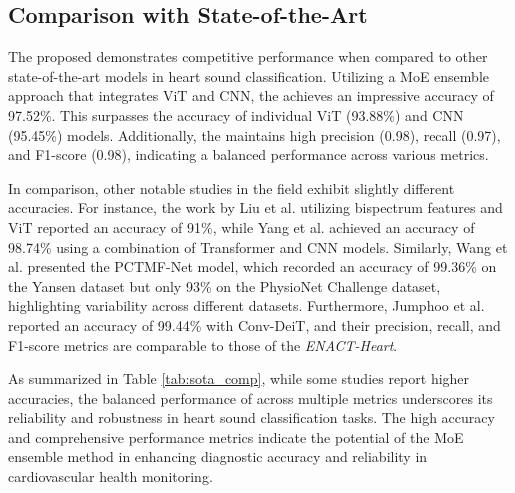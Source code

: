 



\subsection{Comparison with State-of-the-Art}
The proposed \ENACT demonstrates competitive performance when compared to other state-of-the-art models in heart sound classification. Utilizing a MoE ensemble approach that integrates ViT and CNN, the \ENACT achieves an impressive accuracy of 97.52\%. This surpasses the accuracy of individual ViT (93.88\%) and CNN (95.45\%) models. Additionally, the \ENACT maintains high precision (0.98), recall (0.97), and F1-score (0.98), indicating a balanced performance across various metrics.


In comparison, other notable studies in the field exhibit slightly different accuracies. For instance, the work by Liu et al. \cite{liu_heart_2023} utilizing bispectrum features and ViT reported an accuracy of 91\%, while Yang et al. \cite{yang_assisting_2023} achieved an accuracy of 98.74\% using a combination of Transformer and CNN models. Similarly, Wang et al. \cite{wang_pctmf-net_2023} presented the PCTMF-Net model, which recorded an accuracy of 99.36\% on the Yansen dataset but only 93\% on the PhysioNet Challenge dataset, highlighting variability across different datasets. Furthermore, Jumphoo et al. \cite{jumphoo_exploiting_2024} reported an accuracy of 99.44\% with Conv-DeiT, and their precision, recall, and F1-score metrics are comparable to those of the \textit{ENACT-Heart}.

As summarized in Table \ref{tab:sota_comp}, while some studies report higher accuracies, the balanced performance of \ENACT across multiple metrics underscores its reliability and robustness in heart sound classification tasks. The high accuracy and comprehensive performance metrics indicate the potential of the MoE ensemble method in enhancing diagnostic accuracy and reliability in cardiovascular health monitoring.



